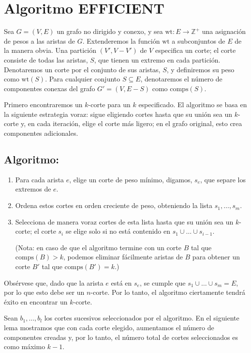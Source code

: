 \documentclass[a4paper, 12pt]{article}
\begin{document}
\section{Algoritmo EFFICIENT}

Sea $G = (V, E)$ un grafo no dirigido y conexo, y sea $\text{wt}: E \to \mathbb{Z}^+$ una asignación de pesos a las aristas de $G$. Extenderemos la función $\text{wt}$ a subconjuntos de $E$ de la manera obvia. Una partición $(V', V - V')$ de $V$ especifica un corte; el corte consiste de todas las aristas, $S$, que tienen un extremo en cada partición. Denotaremos un corte por el conjunto de sus aristas, $S$, y definiremos su peso como $\text{wt}(S)$. Para cualquier conjunto $S \subseteq E$, denotaremos el número de componentes conexas del grafo $G' = (V, E - S)$ como $\text{comps}(S)$.

Primero encontraremos un $k$-corte para un $k$ especificado. El algoritmo se basa en la siguiente estrategia voraz: sigue eligiendo cortes hasta que su unión sea un $k$-corte y, en cada iteración, elige el corte más ligero; en el grafo original, esto crea componentes adicionales.

\subsection*{Algoritmo:}

\begin{enumerate}
    \item Para cada arista $e$, elige un corte de peso mínimo, digamos, $s_e$, que separe los extremos de $e$.
    \item Ordena estos cortes en orden creciente de peso, obteniendo la lista $s_1, \dots, s_m$.
    \item Selecciona de manera voraz cortes de esta lista hasta que su unión sea un $k$-corte; el corte $s_i$ se elige solo si no está contenido en $s_1 \cup \dots \cup s_{i-1}$.
    
    (Nota: en caso de que el algoritmo termine con un corte $B$ tal que $\text{comps}(B) > k$, podemos eliminar fácilmente aristas de $B$ para obtener un corte $B'$ tal que $\text{comps}(B') = k$.)
\end{enumerate}

Obsérvese que, dado que la arista $e$ está en $s_e$, se cumple que $s_1 \cup \dots \cup s_m = E$, por lo que esto debe ser un $n$-corte. Por lo tanto, el algoritmo ciertamente tendrá éxito en encontrar un $k$-corte.

Sean $b_1, \dots, b_l$ los cortes sucesivos seleccionados por el algoritmo. En el siguiente lema mostramos que con cada corte elegido, aumentamos el número de componentes creadas y, por lo tanto, el número total de cortes seleccionados es como máximo $k - 1$.
\end{document}
